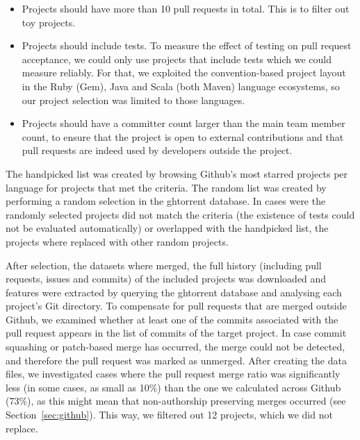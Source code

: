 \documentclass{acm_proc_article-sp}
\begin{document}
\begin{itemize}

  \item Projects should have more than 10 pull requests in total. This is
    to filter out toy projects. 

  \item Projects should include tests. To measure the effect of testing on pull
    request acceptance, we could only use projects that include tests which we
    could measure reliably. For that, we exploited the convention-based project
    layout in the Ruby (Gem), Java and Scala (both Maven) language ecosystems,
    so our project selection was limited to those languages. 

  \item Projects should have a committer count larger than the main team member
    count, to ensure that the project is open to external contributions and that
    pull requests are indeed used by developers outside the project.

\end{itemize}

The \textsf{handpicked} list was created by browsing Github's most starred projects
per language for projects that met the criteria. The \textsf{random} list
was created by performing a random selection in the {\sc ght}orrent database. In
cases were the randomly selected projects did not match the criteria (the existence
of tests could not be evaluated automatically) or overlapped with the
\textsf{handpicked} list, the projects where replaced with
other random projects. 

After selection, the datasets where merged, the full history (including pull
requests, issues and commits) of the included projects was downloaded and
features were extracted by querying the {\sc ght}orrent database and analysing
each project's Git directory.
To compensate for pull requests that are merged
outside Github, we examined whether at least one of the commits associated
with the pull request appears in the list of commits of the target project. In
case commit squashing or patch-based merge has occurred, the merge could not be
detected, and therefore the pull request was marked as unmerged.
After creating the data files, we investigated
cases where the pull request merge ratio was significantly less (in some cases,
as small as 10\%) than the one we calculated across Github (73\%), as this might
mean that non-authorship preserving merges occurred (see Section~\ref{sec:github}). This way, we filtered out 12 projects, which we did not replace. 
\end{document}
